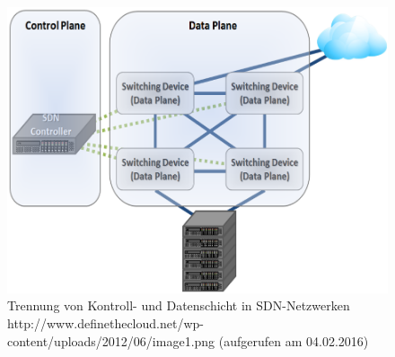 \documentclass[10pt,conference]{IEEEtran}
\begin{document}
\begin{figure}[h]
	\centering
	\includegraphics[width=\columnwidth]{images/control-data-plane.png}
	\caption{Trennung von Kontroll- und Datenschicht in SDN-Netzwerken \newline http://www.definethecloud.net/wp-content/uploads/2012/06/image1.png \newline (aufgerufen am 04.02.2016)}
	\label{fig:SDN_controlDataPlane}
\end{figure}
\end{document}

